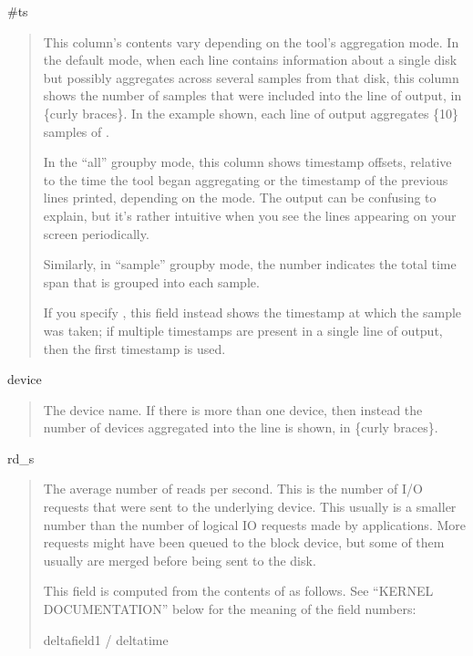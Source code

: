 \documentclass[letterpaper,10pt,english]{sphinxmanual}
\begin{document}
\#ts
\begin{quote}

This column’s contents vary depending on the tool’s aggregation mode.  In the
default mode, when each line contains information about a single disk but
possibly aggregates across several samples from that disk, this column shows the
number of samples that were included into the line of output, in \{curly braces\}.
In the example shown, each line of output aggregates \{10\} samples of
.

In the “all” group\sphinxhyphen{}by mode, this column shows timestamp offsets, relative to the
time the tool began aggregating or the timestamp of the previous lines printed,
depending on the mode.  The output can be confusing to explain, but it’s rather
intuitive when you see the lines appearing on your screen periodically.

Similarly, in “sample” group\sphinxhyphen{}by mode, the number indicates the total time span
that is grouped into each sample.

If you specify {\hyperref[\detokenize{mariadb-iostat:cmdoption-mariadb-iostat-show-timestamps}]{}}, this field instead shows the timestamp at
which the sample was taken; if multiple timestamps are present in a single line
of output, then the first timestamp is used.
\end{quote}

device
\begin{quote}

The device name.  If there is more than one device, then instead the number
of devices aggregated into the line is shown, in \{curly braces\}.
\end{quote}

rd\_s
\begin{quote}

The average number of reads per second.  This is the number of I/O requests that
were sent to the underlying device.  This usually is a smaller number than the
number of logical IO requests made by applications.  More requests might have
been queued to the block device, but some of them usually are merged before
being sent to the disk.

This field is computed from the contents of  as follows.  See
“KERNEL DOCUMENTATION” below for the meaning of the field numbers:

\begin{sphinxVerbatim}[commandchars=\\\{\}]
delta\PYG{o}{[}field1\PYG{o}{]} / delta\PYG{o}{[}time\PYG{o}{]}
\end{sphinxVerbatim}
\end{quote}
\end{document}
